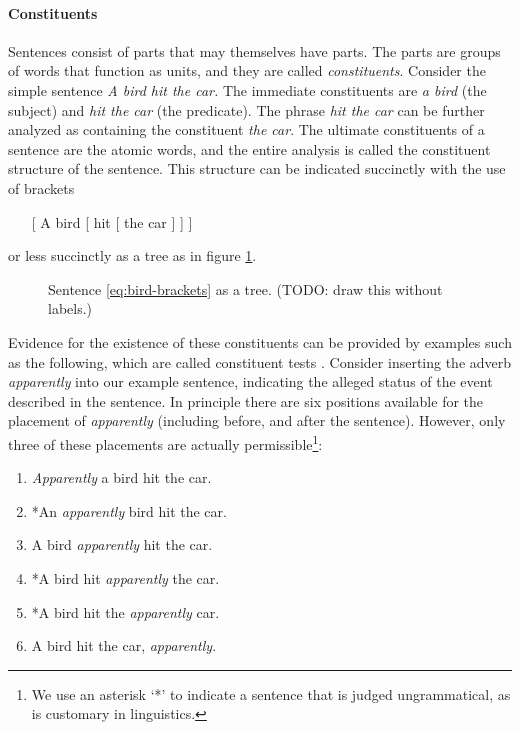 \paragraph{Constituents} Sentences consist of parts that may themselves have parts. The parts are groups of words that function as units, and they are called \textit{constituents}. Consider the simple sentence \textit{A bird hit the car.} The immediate constituents are \textit{a bird} (the subject) and \textit{hit the car} (the predicate). The phrase \textit{hit the car} can be further analyzed as containing the constituent \textit{the car}. The ultimate constituents of a sentence are the atomic words, and the entire analysis is called the constituent structure of the sentence. This structure can be indicated succinctly with the use of brackets
\begin{enumerate}
  \item [ [ A bird ] [ hit [ the car ] ] ]
  \label{eq:bird-brackets}
\end{enumerate}
or less succinctly as a tree as in figure \ref{fig:bird-tree}.
\begin{figure}[h]{\textwidth}
  \center
  \caption{Sentence \ref{eq:bird-brackets} as a tree. (TODO: draw this without labels.)}
  \label{fig:bird-tree}
\end{figure}
Evidence for the existence of these constituents can be provided by examples such as the following, which are called constituent tests \citep{carnie2010constituent}. Consider inserting the adverb \textit{apparently} into our example sentence, indicating the alleged status of the event described in the sentence. In principle there are six positions available for the placement of \textit{apparently} (including before, and after the sentence). However, only three of these placements are actually permissible\footnote{We use an asterisk `*' to indicate a sentence that is judged ungrammatical, as is customary in linguistics.}:
\begin{enumerate}
  \item \textit{Apparently} a bird hit the car.
  \item *An \textit{apparently} bird hit the car.
  \item A bird \textit{apparently} hit the car.
  \item *A bird hit \textit{apparently} the car.
  \item *A bird hit the \textit{apparently} car.
  \item A bird hit the car, \textit{apparently}.
\end{enumerate}
